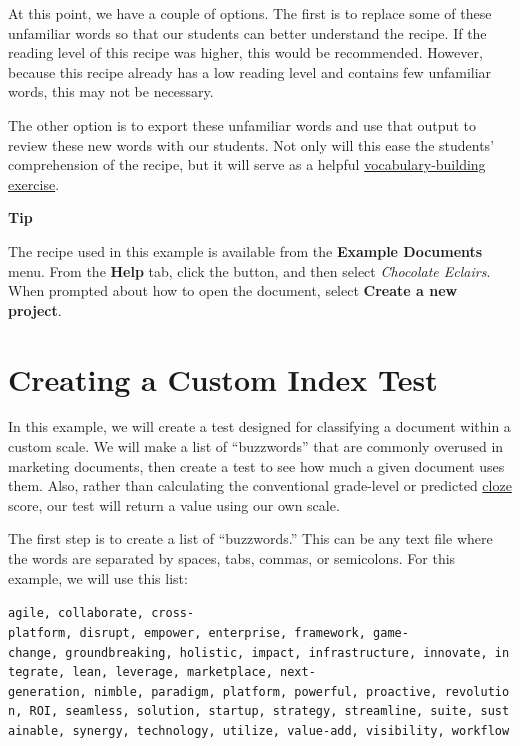 \documentclass[
]{book}
\newenvironment{tipsection}
    {
    \begin{tcolorbox}[colframe=lightgray,colback=lightyellow,arc=3mm]
    \faLightbulb[regular] \textbf{Tip} \newline
    }
    {
    \end{tcolorbox}
    }
\theoremstyle{definition}
\theoremstyle{definition}
\theoremstyle{definition}
\theoremstyle{definition}
\theoremstyle{remark}
\begin{document}
At this point, we have a couple of options. The first is to replace some of these unfamiliar words so that our students can better understand the recipe. If the reading level of this recipe was higher, this would be recommended. However, because this recipe already has a low reading level and contains few unfamiliar words, this may not be necessary.

The other option is to export these unfamiliar words and use that output to review these new words with our students. Not only will this ease the students' comprehension of the recipe, but it will serve as a helpful \protect\hyperlink{vocab-builder-example}{vocabulary-building exercise}.

\begin{tipsection}
The recipe used in this example is available from the \textbf{Example Documents} menu. From the \textbf{Help} tab, click the  button, and then select \emph{Chocolate Eclairs}. When prompted about how to open the document, select \textbf{Create a new project}.

\end{tipsection}


\hypertarget{creating-a-custom-index-test}{%
\section{Creating a Custom Index Test}\label{creating-a-custom-index-test}}

In this example, we will create a test designed for classifying a document within a custom scale. We will make a list of ``buzzwords'' that are commonly overused in marketing documents, then create a test to see how much a given document uses them. Also, rather than calculating the conventional grade-level or predicted \protect\hyperlink{cloze}{cloze} score, our test will return a value using our own scale.

The first step is to create a list of ``buzzwords.'' This can be any text file where the words are separated by spaces, tabs, commas, or semicolons. For this example, we will use this list:

\texttt{agile,\ collaborate,\ cross-platform,\ disrupt,\ empower,\ enterprise,\ framework,\ game-change,\ groundbreaking,\ holistic,\ impact,\ infrastructure,\ innovate,\ integrate,\ lean,\ leverage,\ marketplace,\ next-generation,\ nimble,\ paradigm,\ platform,\ powerful,\ proactive,\ revolution,\ ROI,\ seamless,\ solution,\ startup,\ strategy,\ streamline,\ suite,\ sustainable,\ synergy,\ technology,\ utilize,\ value-add,\ visibility,\ workflow}
\end{document}

